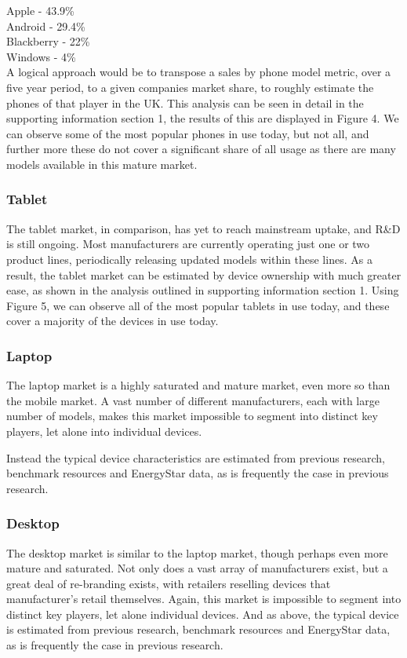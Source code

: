 \documentclass[conference]{IEEEtran}
\begin{document}
Apple - 43.9\%\\
Android - 29.4\%\\
Blackberry - 22\%\\
Windows - 4\%\\

A logical approach would be to transpose a sales by phone model
metric, over a five year period, to a given companies market share, to
roughly estimate the phones of that player in the UK. This analysis
can be seen in detail in the supporting information section 1, the
results of this are displayed in Figure 4. We can observe some of the
most popular phones in use today, but not all, and further more these
do not cover a significant share of all usage as there are many models
available in this mature market.

\subsubsection{Tablet}

The tablet market, in comparison, has yet to reach mainstream uptake,
and R\&D is still ongoing. Most manufacturers are currently operating
just one or two product lines, periodically releasing updated models
within these lines. As a result, the tablet market can be estimated by
device ownership with much greater ease, as shown in the analysis
outlined in supporting information section 1. Using Figure 5, we can
observe all of the most popular tablets in use today, and these cover
a majority of the devices in use today.

\subsubsection{Laptop}

The laptop market is a highly saturated and mature market, even more
so than the mobile market. A vast number of different manufacturers,
each with large number of models, makes this market impossible to
segment into distinct key players, let alone into individual devices.

Instead the typical device characteristics are estimated from previous
research, benchmark resources and EnergyStar data, as is frequently
the case in previous research.

\subsubsection{Desktop}

The desktop market is similar to the laptop market, though perhaps
even more mature and saturated. Not only does a vast array of
manufacturers exist, but a great deal of re-branding exists, with
retailers reselling devices that manufacturer’s retail
themselves. Again, this market is impossible to segment into distinct
key players, let alone individual devices. And as above, the typical
device is estimated from previous research, benchmark resources and
EnergyStar data, as is frequently the case in previous research.
\end{document}
